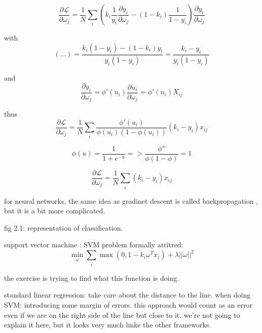 \documentclass[a4paper]{tufte-book}
\begin{document}
\begin{equation}
    \frac{\partial \mathcal{L}}{\partial \omega_j} = \frac{1}{N} \sum_i (k_i \frac{1}{y_i} \frac{\partial y_i}{\partial\omega_j} - (1-k_i)
\frac{1}{1-y_i}) \frac{\partial y_i}{\partial \omega_j}
\end{equation}

with
\begin{equation}
    (\ldots) = \frac{ k_i (1-y_i) - (1-k_i)y_i}{y_i (1-y_i)} = \frac{k_i - y_i}{y_i (1-y_i)} 
\end{equation}


and \begin{equation}
    \frac{\partial y_i}{\partial \omega_j} = \phi'(u_i) \frac{\partial u_i}{\partial \omega_j} = \phi'(u_i) X_{ij}
\end{equation}


thus
\begin{equation}
    \frac{\partial \mathcal{L}}{\partial\omega_j} = \frac{1}{N} \sum_i \frac{\phi'(u_i)}{\phi(u_i) (1-\phi(u_i))} (k_i - y_i) x_{ij}
\end{equation}

\begin{equation}
    \phi (u) = \frac{1}{1+e^{-u}} => \frac{\phi''}{\phi (1-\phi)} = 1
\end{equation}

\begin{equation}
    \frac{\partial \mathcal{L}}{\partial \omega_j} = \frac{1}{N} \sum_i (k_i - y_i) x_{ij}
\end{equation}

for neural networks, the same idea as gradinet descent is called backpropagation
, but it is a bit more complicated.

fig 2.1: representation of classification.

support vector machine : SVM
problem formally attitred: 
\begin{equation}
    \min_\omega \sum_i \max(0,1-k_i \omega^T x_i ) + \lambda ||\omega||^2
\end{equation}

the exercise is trying to find what this function is doing.

standard linear regression: take care about the distance to the line.
when doing SVM: introducing some margin of errors.
this approach would count as an error even if we are on the right side of the
line but close to it.
we're not going to explain it here, but it looks very much linke the other frameworks.
\end{document}
